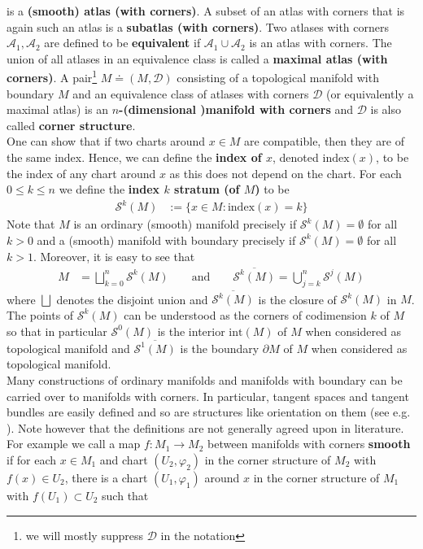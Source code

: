 is a \textbf{(smooth) atlas (with corners)}. A subset of an atlas with corners that is again such an atlas is a \textbf{subatlas (with corners)}. Two atlases with corners $\mathcal{A}_{1},\mathcal{A}_{2}$ are defined to be \textbf{equivalent} if $\mathcal{A}_{1} \cup \mathcal{A}_{2}$ is an atlas with corners. The union of all atlases in an equivalence class is called a \textbf{maximal atlas (with corners)}. A pair\footnote{we will mostly suppress $\mathcal{D}$ in the notation} $M \doteq (M,\mathcal{D})$ consisting of a topological manifold with boundary $M$ and an equivalence class of atlases with corners $\mathcal{D}$ (or equivalently a maximal atlas) is an \textbf{$n$-(dimensional )manifold with corners} and $\mathcal{D}$ is also called \textbf{corner structure}.
\\
One can show that if two charts around $x \in M$ are compatible, then they are of the same index. Hence, we can define the \textbf{index of $x$}, denoted $\mathrm{index}(x)$, to be the index of any chart around $x$ as this does not depend on the chart. For each $0 \leq k \leq n$ we define the \textbf{index $k$ stratum (of $M$)} to be
\begin{align*}
  \mathcal{S}^{k}(M)
  &:=
  \lbrace
    x \in M
    \colon
    \mathrm{index}(x)
    =
    k
  \rbrace
\end{align*}
Note that $M$ is an ordinary (smooth) manifold precisely if $\mathcal{S}^{k}(M) = \emptyset$ for all $k > 0$ and a (smooth) manifold with boundary precisely if $\mathcal{S}^{k}(M) = \emptyset$ for all $k > 1$. Moreover, it is easy to see that
\begin{align*}
  M
  &=
  \bigsqcup_{k=0}^{n}
  \mathcal{S}^{k}(M)
  \qquad
  \text{and}
  \qquad
  \overline{\mathcal{S}^{k}(M)}
  =
  \bigcup_{j=k}^{n}
  \mathcal{S}^{j}(M)
\end{align*}
where $\bigsqcup$ denotes the disjoint union and $\overline{\mathcal{S}^{k}(M)}$ is the closure of $\mathcal{S}^{k}(M)$ in $M$. The points of $\mathcal{S}^{k}(M)$ can be understood as the corners of codimension $k$ of $M$ so that in particular $\mathcal{S}^{0}(M)$ is the interior $\mathrm{int}(M)$ of $M$ when considered as topological manifold and $\overline{\mathcal{S}^{1}(M)}$ is the boundary $\partial M$ of $M$ when considered as topological manifold.
\\
Many constructions of ordinary manifolds and manifolds with boundary can be carried over to manifolds with corners. In particular, tangent spaces and tangent bundles are easily defined and so are structures like orientation on them (see e.g. \cite{a9a08fe2}). Note however that the definitions are not generally agreed upon in literature. For example we call a map $f \colon M_{1} \to M_{2}$ between manifolds with corners \textbf{smooth} if for each $x \in M_{1}$ and chart $(U_{2},\varphi_{2})$ in the corner structure of $M_{2}$ with $f(x) \in U_{2}$, there is a chart $(U_{1},\varphi_{1})$ around $x$ in the corner structure of $M_{1}$ with $f(U_{1}) \subset U_{2}$ such that

